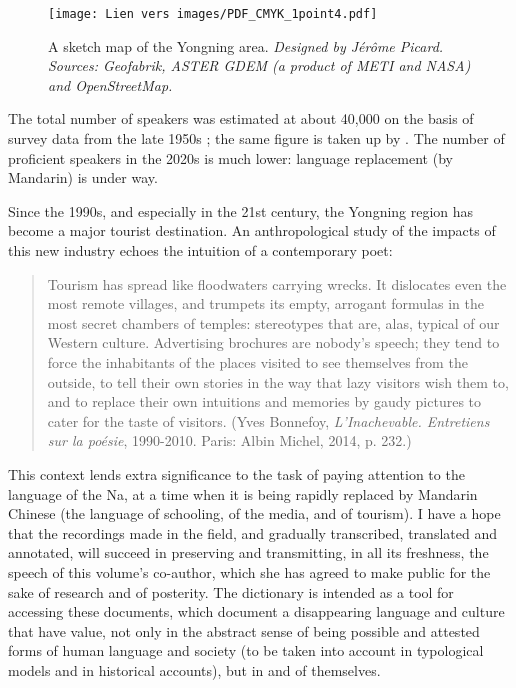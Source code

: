 \begin{figure}
	\caption{A sketch map of the Yongning area. \emph{Designed by Jérôme Picard. Sources: Geofabrik, ASTER GDEM (a product of METI and NASA) and OpenStreetMap.}}
	\texttt{[image: Lien vers images/PDF\_CMYK\_1point4.pdf]}
	\label{map:1-1}
\end{figure}

The total number of speakers was estimated at about 40,000 on the basis of survey data from the late 1950s \parencite[107]{heetal1985}; the same figure is taken up by \parencite{yang2009}. The number of proficient speakers in the 2020s is much lower: language replacement (by Mandarin) is under way.

Since the 1990s, and especially in the 21st century, the Yongning region has become a major tourist destination. An anthropological study of the impacts of this new industry \parencite{milan_tourisme_2019} echoes the intuition of a contemporary poet:

\begin{quote}
    Tourism has spread like floodwaters carrying wrecks. It dislocates even the most remote villages, and trumpets its empty, arrogant formulas in the most secret chambers of temples: stereotypes that are, alas, typical of our Western culture. Advertising brochures are nobody's speech; they tend to force the inhabitants of the places visited to see themselves from the outside, to tell their own stories in the way that lazy visitors wish them to, and to replace their own intuitions and memories by gaudy pictures to cater for the taste of visitors. (Yves Bonnefoy, \emph{L'Inachevable. Entretiens sur la poésie}, 1990-2010. Paris: Albin Michel, 2014, p. 232.)
\end{quote}

This context lends extra significance to the task of paying attention to the language of the Na, at a time when it is being rapidly replaced by Mandarin Chinese (the language of schooling, of the media, and of tourism). I have a hope that the recordings made in the field, and gradually transcribed, translated and annotated, will succeed in preserving and transmitting, in all its freshness, the speech of this volume's co-author, which she has agreed to make public for the sake of research and of posterity. The dictionary is intended as a tool for accessing these documents, which document a disappearing language and culture that have value, not only in the abstract sense of being possible and attested forms of human language and society (to be taken into account in typological models and in historical accounts), but in and of themselves.

